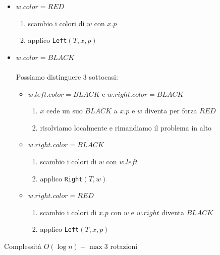 \begin{itemize}
    \item $w.color = RED$
    \begin{enumerate}
        \item scambio i colori di $w$ con $x.p$
        \item applico \verb|Left|$(T,x,p)$ 
    \end{enumerate}
    \item $w.color = BLACK$ \\~\\
    Possiamo distinguere 3 sottocasi:
    \begin{itemize}
        \item $w.left.color = BLACK$ e $w.right.color = BLACK$
        \begin{enumerate}
            \item $x$ cede un suo $BLACK$ a $x.p$ e $w$ diventa per forza $RED$
            \item risolviamo localmente e rimandiamo il problema in alto
        \end{enumerate}
        \item $w.right.color = BLACK$
        \begin{enumerate}
            \item scambio i colori di $w$ con $w.left$
            \item applico \verb|Right|$(T,w)$
        \end{enumerate}
        \item $w.right.color = RED$
        \begin{enumerate}
            \item scambio i colori di $x.p$ con $w$ e $w.right$ diventa $BLACK$
            \item applico \verb|Left|$(T,x,p)$
        \end{enumerate}
    \end{itemize}
\end{itemize}
Complessità $O(\log n) + \max 3$ rotazioni


